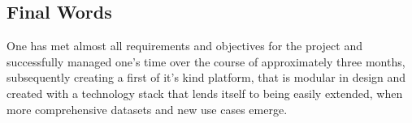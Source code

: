   \subsection{Final Words}
    One has met almost all requirements and objectives for the project and successfully managed one's time over the course of approximately three months, subsequently creating a first of it's kind platform, that is modular in design and created with a technology stack that lends itself to being easily extended, when more comprehensive datasets and new use cases emerge. 
